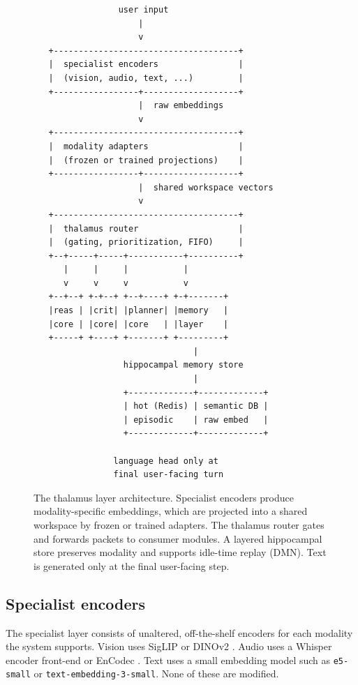 \documentclass[11pt]{article}
\begin{document}
\begin{figure}[ht]
\centering
\begin{verbatim}
                 user input
                     |
                     v
   +-------------------------------------+
   |  specialist encoders                |
   |  (vision, audio, text, ...)         |
   +-----------------+-------------------+
                     |  raw embeddings
                     v
   +-------------------------------------+
   |  modality adapters                  |
   |  (frozen or trained projections)    |
   +-----------------+-------------------+
                     |  shared workspace vectors
                     v
   +-------------------------------------+
   |  thalamus router                    |
   |  (gating, prioritization, FIFO)     |
   +--+-----+-----+-----------+----------+
      |     |     |           |
      v     v     v           v
   +--+--+ +-+--+ +--+----+ +-+-------+
   |reas | |crit| |planner| |memory   |
   |core | |core| |core   | |layer    |
   +-----+ +----+ +-------+ +---------+
                                |
                  hippocampal memory store
                                |
                  +-------------+-------------+
                  | hot (Redis) | semantic DB |
                  | episodic    | raw embed   |
                  +-------------+-------------+

                language head only at
                final user-facing turn
\end{verbatim}
\caption{The thalamus layer architecture. Specialist encoders
produce modality-specific embeddings, which are projected into
a shared workspace by frozen or trained adapters. The thalamus
router gates and forwards packets to consumer modules. A
layered hippocampal store preserves modality and supports
idle-time replay (DMN). Text is generated only at the final
user-facing step.}
\label{fig:arch}
\end{figure}

\subsection{Specialist encoders}
The specialist layer consists of unaltered, off-the-shelf
encoders for each modality the system supports. Vision uses
SigLIP \cite{siglip} or DINOv2 \cite{dinov2}. Audio uses a
Whisper encoder front-end \cite{whisper} or EnCodec
\cite{encodec}. Text uses a small embedding model such as
\texttt{e5-small} \cite{e5} or
\texttt{text-embedding-3-small}. None of these are modified.
\end{document}
